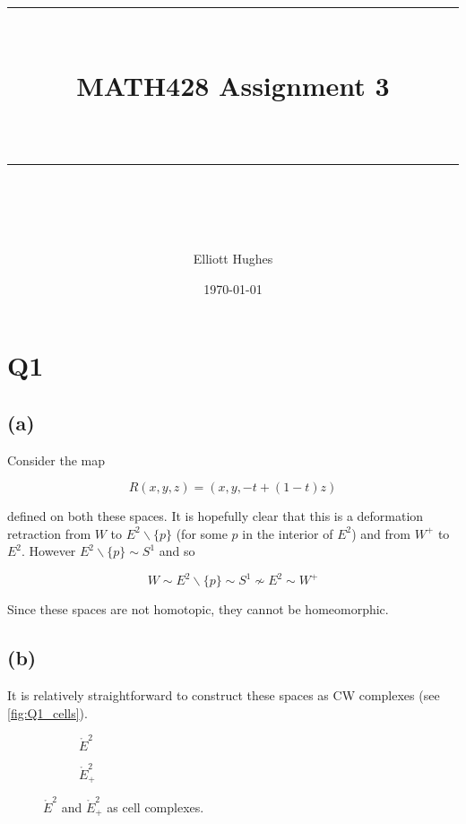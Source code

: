 \documentclass{article}
\title{	
	\normalfont\normalsize 
	\rule{\linewidth}{0.5pt}\\ %
	\vspace{14pt} %
	{\LARGE MATH428 Assignment 3 \\ %
    \large \textit{} \\}
	\vspace{6pt} %
	\rule{\linewidth}{1pt}\\ %
}
\author{Elliott Hughes}
\date{\normalsize\today}
\begin{document}
\maketitle

\section*{Q1}
\subsection*{(a)}
Consider the map 

\begin{equation*}
    R(x,y,z) = (x,y,-t + (1-t)z)
\end{equation*}

defined on both these spaces. It is hopefully clear that this is a deformation retraction 
from $W$ to $E^2\backslash\{p\}$ (for some $p$ in the interior of $E^2$) and from $W^+$ to $E^2$. However 
$E^2\backslash\{p\} \sim S^1$ and so 

\begin{equation*}
    W \sim E^2\backslash\{p\} \sim S^1 \nsim E^2 \sim W^+
\end{equation*}

Since these spaces are not homotopic, they cannot be homeomorphic.

\subsection*{(b)}
It is relatively straightforward to construct these spaces as CW complexes (see \autoref{fig:Q1_cells}).

\begin{figure}[H]
    \centering
    \begin{subfigure}[b]{0.4\textwidth}
        \centering
    \caption{$\mathring{E}^2$}
    \end{subfigure}
    \begin{subfigure}[b]{0.4\textwidth}
        \centering
    \caption{$\mathring{E}^2_+$}
    \end{subfigure}
      \caption{$\mathring{E}^2$ and $\mathring{E}^2_+$ as cell complexes.}
      \label{fig:Q1_cells}
\end{figure}
\end{document}
